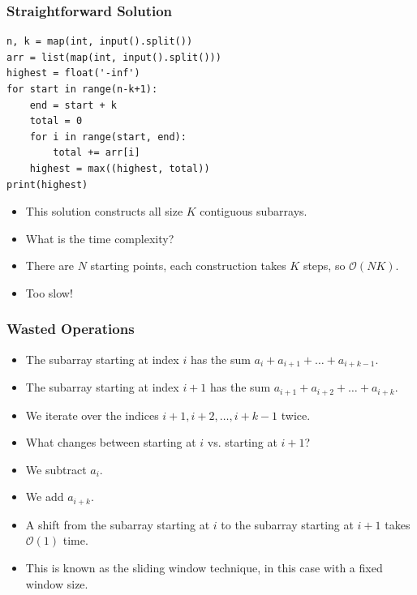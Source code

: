 \documentclass{beamer}
\begin{document}
\begin{frame}
    \frametitle{Straightforward Solution}
	\begin{scriptsize}
        \begin{verbatim}
n, k = map(int, input().split())
arr = list(map(int, input().split()))
highest = float('-inf')
for start in range(n-k+1):
    end = start + k
    total = 0
    for i in range(start, end):
        total += arr[i]
    highest = max((highest, total))
print(highest)
        \end{verbatim}
    \end{scriptsize}
    \begin{itemize}
        \item<2-> This solution constructs all size $K$ contiguous subarrays.
        \item<3-> What is the time complexity?
        \item<4-> There are $N$ starting points, each construction takes $K$ steps, so $\mathcal{O}(NK)$.
        \item<5-> Too slow!
    \end{itemize}
\end{frame}

\begin{frame}
    \frametitle{Wasted Operations}
    \begin{itemize}
        \item<1-> The subarray starting at index $i$ has the sum $a_i + a_{i+1} + \dots + a_{i+k-1}$.
        \item<2-> The subarray starting at index $i+1$ has the sum $a_{i+1} + a_{i+2} + \dots + a_{i+k}$.
        \item<3-> We iterate over the indices $i+1, i+2, \dotsc, i+k-1$ twice.
        \item<4-> What changes between starting at $i$ vs. starting at $i+1$?
        \item<5-> We subtract $a_i$.
        \item<6-> We add $a_{i+k}$.
        \item<7-> A shift from the subarray starting at $i$ to the subarray starting at $i+1$ takes $\mathcal{O}(1)$ time.
        \item<8-> This is known as the sliding window technique, in this case with a fixed window size.
    \end{itemize}
\end{frame}
\end{document}
